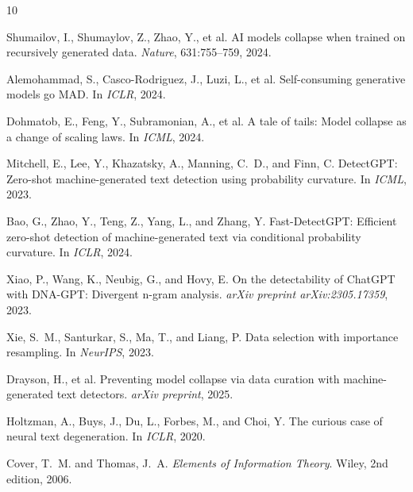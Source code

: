\documentclass[11pt,a4paper]{article}
\begin{document}

\begin{thebibliography}{10}

Shumailov, I., Shumaylov, Z., Zhao, Y., et al.
\newblock AI models collapse when trained on recursively generated data.
\newblock \emph{Nature}, 631:755--759, 2024.

Alemohammad, S., Casco-Rodriguez, J., Luzi, L., et al.
\newblock Self-consuming generative models go MAD.
\newblock In \emph{ICLR}, 2024.

Dohmatob, E., Feng, Y., Subramonian, A., et al.
\newblock A tale of tails: Model collapse as a change of scaling laws.
\newblock In \emph{ICML}, 2024.

Mitchell, E., Lee, Y., Khazatsky, A., Manning, C.~D., and Finn, C.
\newblock DetectGPT: Zero-shot machine-generated text detection using probability curvature.
\newblock In \emph{ICML}, 2023.

Bao, G., Zhao, Y., Teng, Z., Yang, L., and Zhang, Y.
\newblock Fast-DetectGPT: Efficient zero-shot detection of machine-generated text via conditional probability curvature.
\newblock In \emph{ICLR}, 2024.

Xiao, P., Wang, K., Neubig, G., and Hovy, E.
\newblock On the detectability of ChatGPT with DNA-GPT: Divergent n-gram analysis.
\newblock \emph{arXiv preprint arXiv:2305.17359}, 2023.

Xie, S.~M., Santurkar, S., Ma, T., and Liang, P.
\newblock Data selection with importance resampling.
\newblock In \emph{NeurIPS}, 2023.

Drayson, H., et al.
\newblock Preventing model collapse via data curation with machine-generated text detectors.
\newblock \emph{arXiv preprint}, 2025.

Holtzman, A., Buys, J., Du, L., Forbes, M., and Choi, Y.
\newblock The curious case of neural text degeneration.
\newblock In \emph{ICLR}, 2020.

Cover, T.~M. and Thomas, J.~A.
\newblock \emph{Elements of Information Theory}.
\newblock Wiley, 2nd edition, 2006.

\end{thebibliography}
\end{document}
